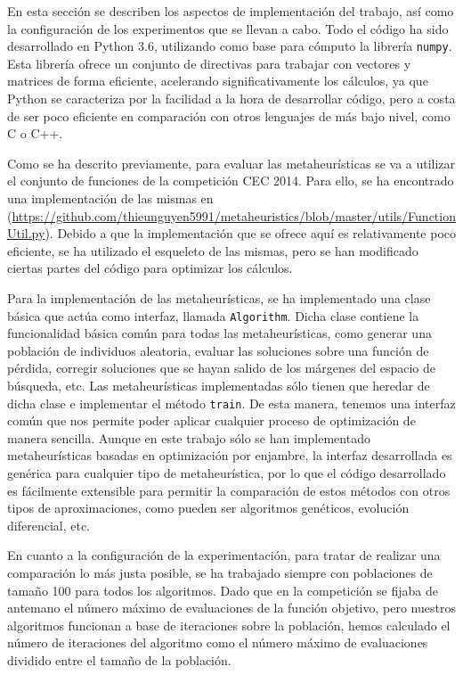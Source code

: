 \documentclass[
  a4paper,
,tablecaptionabove
]{scrartcl}
\begin{document}
En esta sección se describen los aspectos de implementación del trabajo,
así como la configuración de los experimentos que se llevan a cabo. Todo
el código ha sido desarrollado en Python 3.6, utilizando como base para
cómputo la librería \texttt{numpy}. Esta librería ofrece un conjunto de
directivas para trabajar con vectores y matrices de forma eficiente,
acelerando significativamente los cálculos, ya que Python se caracteriza
por la facilidad a la hora de desarrollar código, pero a costa de ser
poco eficiente en comparación con otros lenguajes de más bajo nivel,
como C o C++.

Como se ha descrito previamente, para evaluar las metaheurísticas se va
a utilizar el conjunto de funciones de la competición CEC 2014. Para
ello, se ha encontrado una implementación de las mismas en
(\url{https://github.com/thieunguyen5991/metaheuristics/blob/master/utils/FunctionUtil.py}).
Debido a que la implementación que se ofrece aquí es relativamente poco
eficiente, se ha utilizado el esqueleto de las mismas, pero se han
modificado ciertas partes del código para optimizar los cálculos.

Para la implementación de las metaheurísticas, se ha implementado una
clase básica que actúa como interfaz, llamada \texttt{Algorithm}. Dicha
clase contiene la funcionalidad básica común para todas las
metaheurísticas, como generar una población de individuos aleatoria,
evaluar las soluciones sobre una función de pérdida, corregir soluciones
que se hayan salido de los márgenes del espacio de búsqueda, etc. Las
metaheurísticas implementadas sólo tienen que heredar de dicha clase e
implementar el método \texttt{train}. De esta manera, tenemos una
interfaz común que nos permite poder aplicar cualquier proceso de
optimización de manera sencilla. Aunque en este trabajo sólo se han
implementado metaheurísticas basadas en optimización por enjambre, la
interfaz desarrollada es genérica para cualquier tipo de metaheurística,
por lo que el código desarrollado es fácilmente extensible para permitir
la comparación de estos métodos con otros tipos de aproximaciones, como
pueden ser algoritmos genéticos, evolución diferencial, etc.

En cuanto a la configuración de la experimentación, para tratar de
realizar una comparación lo más justa posible, se ha trabajado siempre
con poblaciones de tamaño 100 para todos los algoritmos. Dado que en la
competición se fijaba de antemano el número máximo de evaluaciones de la
función objetivo, pero nuestros algoritmos funcionan a base de
iteraciones sobre la población, hemos calculado el número de iteraciones
del algoritmo como el número máximo de evaluaciones dividido entre el
tamaño de la población.
\end{document}
